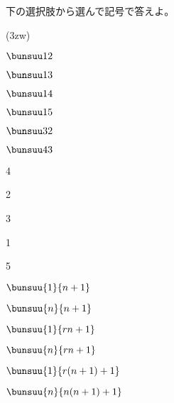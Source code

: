 下の選択肢から選んで記号で答えよ。
\begin{jquote}(3zw)
\begin{betaenumerate}[A. ]
\item $\bunsuu12$
\item $\bunsuu13$
\item $\bunsuu14$
\item $\bunsuu15$
\item $\bunsuu32$
\item $\bunsuu43$
\item 4
\item 2
\item 3
\item 1
\item 5
\item $\bunsuu{1}{n+1}$
\item $\bunsuu{n}{n+1}$
\item $\bunsuu{1}{rn+1}$
\item $\bunsuu{n}{rn+1}$
\item $\bunsuu{1}{r(n+1)+1}$
\item $\bunsuu{n}{n(n+1)+1}$
\end{betaenumerate}
\end{jquote}
